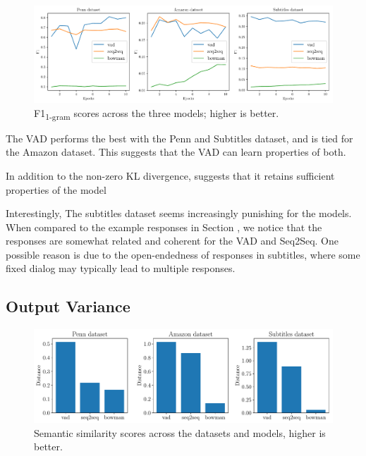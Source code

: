 \documentclass[12pt,twoside]{report}
\begin{document}
\begin{figure}[!ht]
	\centering
	\includegraphics[width=150mm]{results/f1.pdf}
	\caption{F1\textsubscript{1-gram} scores across the three models; higher is better.\label{r:f1}}
	\end{figure}
	
The VAD performs the best with the Penn and Subtitles dataset, and is tied for the Amazon dataset. This suggests that the VAD can learn properties of both.

In addition to the non-zero KL divergence, suggests that it retains sufficient properties of the model 

Interestingly, The subtitles dataset seems increasingly punishing for the models. When compared to the example responses in Section \label{sampling_examples}, we notice that the responses are somewhat related and coherent for the VAD and Seq2Seq. One possible reason is due to the open-endedness of responses in subtitles, where some fixed dialog may typically lead to multiple responses.


\subsection{Output Variance}

\begin{figure}[!ht]
	\centering
	\includegraphics[width=150mm]{results/semantic_similarity.pdf}
	\caption{Semantic similarity scores across the datasets and models, higher is better.\label{r:variance}}
	\end{figure}
\end{document}
